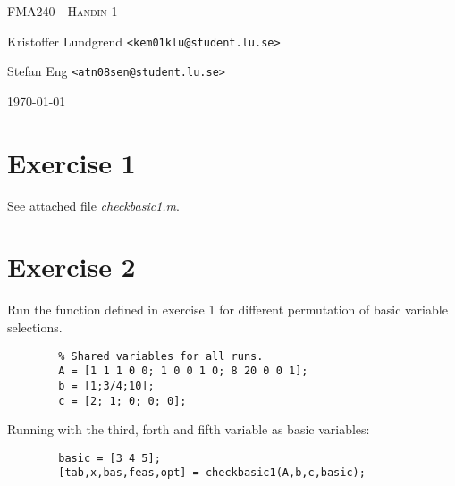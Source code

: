 \documentclass{article}
\begin{document}
\begin{titlepage}
	\centering
	{\scshape\Large FMA240 - Handin 1\par}
	\vspace{1cm}
	Kristoffer Lundgrend \texttt{<kem01klu@student.lu.se>}\par
	Stefan Eng \texttt{<atn08sen@student.lu.se>}\par
    \vspace{1cm}
	\today\par
\end{titlepage}



\section*{Exercise 1}

    See attached file \textit{checkbasic1.m}.

\section*{Exercise 2}

    Run the function defined in exercise 1 for different permutation of
    basic variable selections.

    \begin{lstlisting}
        % Shared variables for all runs.
        A = [1 1 1 0 0; 1 0 0 1 0; 8 20 0 0 1];
        b = [1;3/4;10];
        c = [2; 1; 0; 0; 0];
    \end{lstlisting}

    Running with the third, forth and fifth variable as basic variables:

    \begin{lstlisting}
        basic = [3 4 5];
        [tab,x,bas,feas,opt] = checkbasic1(A,b,c,basic);
    \end{lstlisting}
\end{document}
